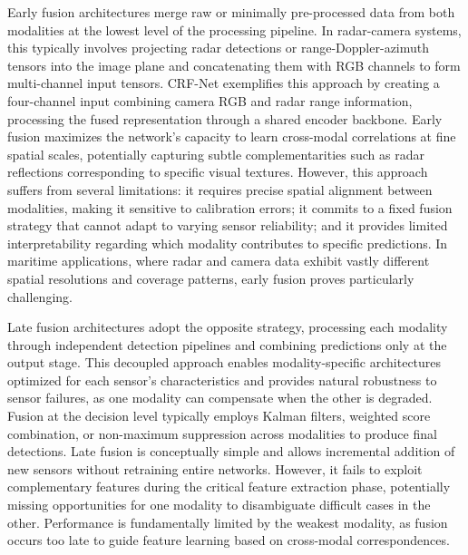 Early fusion architectures merge raw or minimally pre-processed data from both modalities at the lowest level of the processing pipeline. In radar-camera systems, this typically involves projecting radar detections or range-Doppler-azimuth tensors into the image plane and concatenating them with RGB channels to form multi-channel input tensors. CRF-Net \cite{Nobis2019CRFNet} exemplifies this approach by creating a four-channel input combining camera RGB and radar range information, processing the fused representation through a shared encoder backbone. Early fusion maximizes the network's capacity to learn cross-modal correlations at fine spatial scales, potentially capturing subtle complementarities such as radar reflections corresponding to specific visual textures. However, this approach suffers from several limitations: it requires precise spatial alignment between modalities, making it sensitive to calibration errors; it commits to a fixed fusion strategy that cannot adapt to varying sensor reliability; and it provides limited interpretability regarding which modality contributes to specific predictions. In maritime applications, where radar and camera data exhibit vastly different spatial resolutions and coverage patterns, early fusion proves particularly challenging.

Late fusion architectures adopt the opposite strategy, processing each modality through independent detection pipelines and combining predictions only at the output stage. This decoupled approach enables modality-specific architectures optimized for each sensor's characteristics and provides natural robustness to sensor failures, as one modality can compensate when the other is degraded. Fusion at the decision level typically employs Kalman filters, weighted score combination, or non-maximum suppression across modalities to produce final detections. Late fusion is conceptually simple and allows incremental addition of new sensors without retraining entire networks. However, it fails to exploit complementary features during the critical feature extraction phase, potentially missing opportunities for one modality to disambiguate difficult cases in the other. Performance is fundamentally limited by the weakest modality, as fusion occurs too late to guide feature learning based on cross-modal correspondences.

